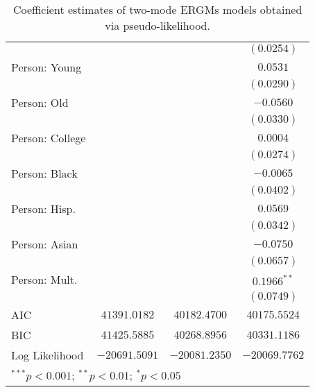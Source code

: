 \begin{table}
\begin{center}
\begin{tabular}{l c c c}
                &                 &                 & $(0.0254)$      \\
Person: Young   &                 &                 & $0.0531$        \\
                &                 &                 & $(0.0290)$      \\
Person: Old     &                 &                 & $-0.0560$       \\
                &                 &                 & $(0.0330)$      \\
Person: College &                 &                 & $0.0004$        \\
                &                 &                 & $(0.0274)$      \\
Person: Black   &                 &                 & $-0.0065$       \\
                &                 &                 & $(0.0402)$      \\
Person: Hisp.   &                 &                 & $0.0569$        \\
                &                 &                 & $(0.0342)$      \\
Person: Asian   &                 &                 & $-0.0750$       \\
                &                 &                 & $(0.0657)$      \\
Person: Mult.   &                 &                 & $0.1966^{**}$   \\
                &                 &                 & $(0.0749)$      \\
\midrule
AIC             & $41391.0182$    & $40182.4700$    & $40175.5524$    \\
BIC             & $41425.5885$    & $40268.8956$    & $40331.1186$    \\
Log Likelihood  & $-20691.5091$   & $-20081.2350$   & $-20069.7762$   \\
\bottomrule
\multicolumn{4}{l}{\scriptsize{$^{***}p<0.001$; $^{**}p<0.01$; $^{*}p<0.05$}}
\end{tabular}
\caption{Coefficient estimates of two-mode ERGMs models obtained via pseudo-likelihood.}
\label{tab:reg1}
\end{center}
\end{table}
